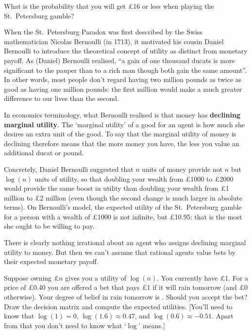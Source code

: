 \begin{exercise}{1}
  What is the probability that you will get £16 or less when playing
  the St.\ Petersburg gamble?
\end{exercise}

When the St.\ Petersburg Paradox was first described by the Swiss
mathematician Nicolas Bernoulli (in 1713), it motivated his cousin
Daniel Bernoulli to introduce the theoretical concept of utility as
distinct from monetary payoff. As (Daniel) Bernoulli realised, ``a
gain of one thousand ducats is more significant to the pauper than to
a rich man though both gain the same amount''. In other words, most
people don't regard having two million pounds as twice as good as
having one million pounds: the first million would make a much greater
difference to our lives than the second.

In economics terminology, what Bernoulli realised is that money has
\textbf{declining marginal utility}. The `marginal utility' of a good
for an agent is how much she desires an extra unit of the good. To say
that the marginal utility of money is declining therefore means that
the more money you have, the less you value an additional ducat or pound.

Concretely, Daniel Bernoulli suggested that $n$ units of money provide
not $n$ but $\log(n)$ units of utility, so that doubling your wealth
from £1000 to £2000 would provide the same boost in utility than
doubling your wealth from £1 million to £2 million (even though the
second change is much larger in absolute terms). On Bernoulli's model,
the expected utility of the St.\ Petersburg gamble for a person with a
wealth of £1000 is not infinite, but £10.95: that is the most she
ought to be willing to pay.

There is clearly nothing irrational about an agent who assigns
declining marginal utility to money. But then we can't assume that
rational agents value bets by their expected monetary payoff.

\begin{exercise}{2}
  Suppose owning £$n$ gives you a utility of $\log(n)$. You currently
  have £1. For a price of £0.40 you are offered a bet that pays £1 if
  it will rain tomorrow (and £0 otherwise). Your degree of belief in
  rain tomorrow is . Should you accept the bet?  Draw
  the decision matrix and compute the expected utilities. [You'll need
  to know that $\log(1) = 0$, $\log(1.6) \approx 0.47$, and $\log(0.6)
  \approx -0.51$. Apart from that you don't need to know what `$\log$'
  means.] 
\end{exercise}

